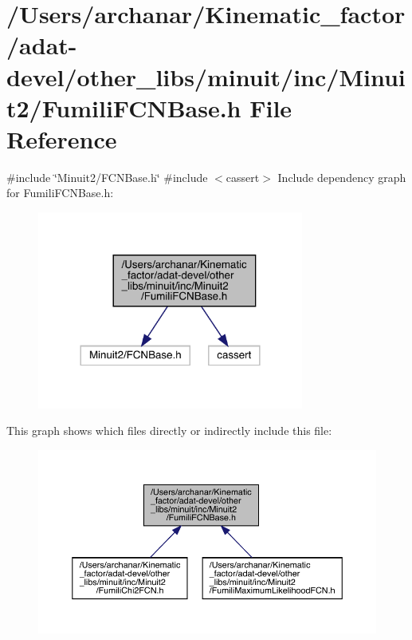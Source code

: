 \hypertarget{adat-devel_2other__libs_2minuit_2inc_2Minuit2_2FumiliFCNBase_8h}{}\section{/\+Users/archanar/\+Kinematic\+\_\+factor/adat-\/devel/other\+\_\+libs/minuit/inc/\+Minuit2/\+Fumili\+F\+C\+N\+Base.h File Reference}
\label{adat-devel_2other__libs_2minuit_2inc_2Minuit2_2FumiliFCNBase_8h}
{\ttfamily \#include \char`\"{}Minuit2/\+F\+C\+N\+Base.\+h\char`\"{}}\newline
{\ttfamily \#include $<$cassert$>$}\newline
Include dependency graph for Fumili\+F\+C\+N\+Base.\+h\+:
\nopagebreak
\begin{figure}[H]
\begin{center}
\leavevmode
\includegraphics[width=248pt]{d1/db5/adat-devel_2other__libs_2minuit_2inc_2Minuit2_2FumiliFCNBase_8h__incl}
\end{center}
\end{figure}
This graph shows which files directly or indirectly include this file\+:
\nopagebreak
\begin{figure}[H]
\begin{center}
\leavevmode
\includegraphics[width=350pt]{d6/d0f/adat-devel_2other__libs_2minuit_2inc_2Minuit2_2FumiliFCNBase_8h__dep__incl}
\end{center}
\end{figure}
